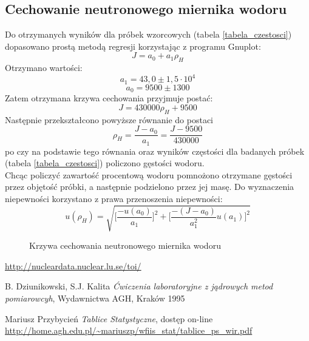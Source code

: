 \documentclass{article}
\begin{document}
\subsection{Cechowanie neutronowego miernika wodoru}
Do otrzymanych wyników dla próbek wzorcowych (tabela \ref{tabela_czestosci}) dopasowano prostą metodą regresji korzystając z programu Gnuplot:
\begin{equation}
	J = a_0 + a_1\rho_H
\end{equation}
 Otrzymano wartości:
 \begin{equation*}
 	a_1 = 43,0 \pm 1,5\cdot 10^4
 \end{equation*}
 \begin{equation*}
 	a_0 = 9500 \pm 1300
 \end{equation*}
Zatem otrzymana krzywa cechowania przyjmuje postać:
\begin{equation*}
	J = 430000\rho_H + 9500
\end{equation*}
Następnie przekształcono powyższe równanie do postaci\\
\[\rho _H = \frac{J-a_0}{a_1} = \frac{J-9500}{430000}
\]
po czy na podstawie tego równania oraz wyników częstości dla badanych próbek (tabela \ref{tabela_czestosci}) policzono gęstości wodoru. \\
Chcąc policzyć zawartość procentową wodoru pomnożono otrzymane gęstości przez objętość próbki, a następnie podzielono przez jej masę. Do wyznaczenia niepewności korzystano z prawa przenoszenia niepewności:
\[u(\rho _H) = \sqrt{ \Bigg[ \frac{-u(a_0)}{a_1} \Bigg]^2 + \Bigg[ \frac{-(J-a_0)}{a_1^2}u(a_1) \Bigg]^2 }
\]



\begin{figure}[h!]
	\fontsize{6}{8}\selectfont %
	\centering
	\resizebox{1.0\textwidth}{!}{}	
	\caption{Krzywa cechowania neutronowego miernika wodoru}
	\label{krzywa}
\end{figure}


\newpage
\begin{thebibliography}{9}
	
	
	\url{http://nucleardata.nuclear.lu.se/toi/}

	
	B. Dziunikowski, S.J. Kalita
	\emph{Ćwiczenia laboratoryjne z jądrowych metod pomiarowcyh}, Wydawnictwa AGH, Kraków 1995
	
	Mariusz Przybycień \emph{Tablice Statystyczne}, dostęp on-line\\
	\url{http://home.agh.edu.pl/~mariuszp/wfiis_stat/tablice_ps_wir.pdf}
\end{thebibliography}
\vspace{2cm}
\end{document}
